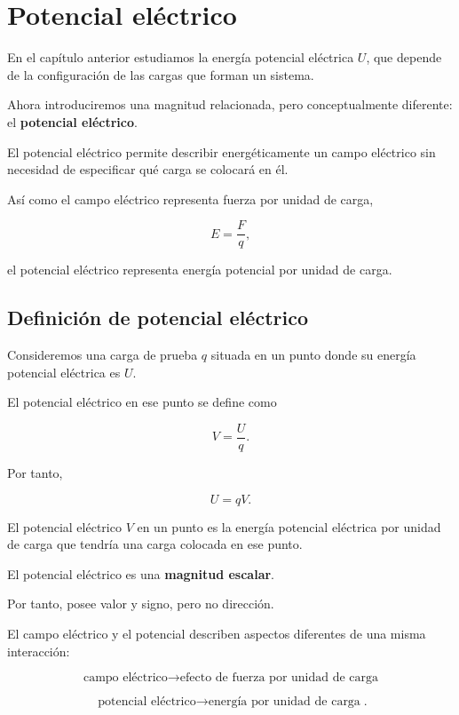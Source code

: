\section{Potencial eléctrico}

En el capítulo anterior estudiamos la energía potencial eléctrica \(U\), que depende
de la configuración de las cargas que forman un sistema.

Ahora introduciremos una magnitud relacionada, pero conceptualmente diferente:
el \textbf{potencial eléctrico}.

El potencial eléctrico permite describir energéticamente un campo eléctrico sin
necesidad de especificar qué carga se colocará en él.

Así como el campo eléctrico representa fuerza por unidad de carga,

\[
E=\frac{F}{q},
\]

el potencial eléctrico representa energía potencial por unidad de carga.


\subsection{Definición de potencial eléctrico}

Consideremos una carga de prueba \(q\) situada en un punto donde su energía potencial
eléctrica es \(U\).

El potencial eléctrico en ese punto se define como

\begin{equation}
\boxed{
V=\frac{U}{q}
}.
\end{equation}

Por tanto,

\begin{equation}
\boxed{
U=qV
}.
\end{equation}

\begin{definicion}

El potencial eléctrico \(V\) en un punto es la energía potencial eléctrica por unidad
de carga que tendría una carga colocada en ese punto.

\end{definicion}

El potencial eléctrico es una \textbf{magnitud escalar}.

Por tanto, posee valor y signo, pero no dirección.


\begin{idea}

El campo eléctrico y el potencial describen aspectos diferentes de una misma
interacción:

\[
\boxed{\text{campo eléctrico}\longrightarrow\text{efecto de fuerza por unidad de carga}}
\]

\[
\boxed{\text{potencial eléctrico}\longrightarrow\text{energía por unidad de carga}}.
\]

\end{idea}


